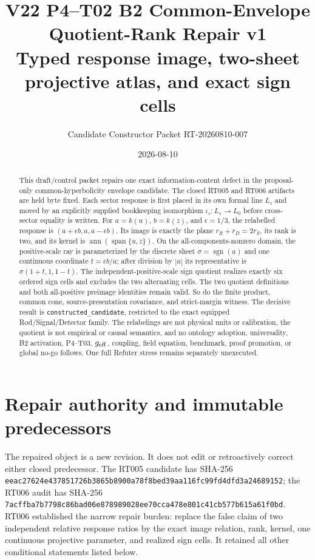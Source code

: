 \documentclass[11pt]{article}
\title{V22 P4--T02 B2 Common-Envelope Quotient-Rank Repair v1\\
\large Typed response image, two-sheet projective atlas, and exact sign cells}
\author{Candidate Constructor Packet RT-20260810-007}
\date{2026-08-10}
\newcommand{\ann}{\operatorname{ann}}
\newcommand{\sgn}{\operatorname{sgn}}
\begin{document}
\sloppy
\maketitle

\begin{abstract}
This draft/control packet repairs one exact information-content defect in the
proposal-only common-hyperbolicity envelope candidate.  The closed RT005 and
RT006 artifacts are held byte fixed.  Each sector response is first placed in
its own formal line $L_s$ and moved by an explicitly supplied bookkeeping
isomorphism $\iota_s:L_s\to L_0$ before cross-sector equality is written.
For $a=k(u)$, $b=k(z)$, and $\epsilon=1/3$, the relabelled response is
$(a+\epsilon b,a,a-\epsilon b)$.  Its image is exactly the plane
$r_R+r_D=2r_S$, its rank is two, and its kernel is
$\ann(\operatorname{span}\{u,z\})$.  On the all-components-nonzero domain,
the positive-scale ray is parameterized by the discrete sheet
$\sigma=\sgn(a)$ and one continuous coordinate
$t=\epsilon b/a$; after division by $|a|$ its representative is
$\sigma(1+t,1,1-t)$.  The independent-positive-scale sign quotient realizes
exactly six ordered sign cells and excludes the two alternating cells.
The two quotient definitions and both all-positive preimage identities remain
valid.  So do the finite product, common cone, source-presentation covariance,
and strict-margin witness.  The decisive result is
\texttt{constructed\_candidate}, restricted to the exact equipped
Rod/Signal/Detector family.  The relabelings are not physical units or
calibration, the quotient is not empirical or causal semantics, and no
ontology adoption, universality, B2 activation, P4--T03, $g_{\rm eff}$,
coupling, field equation, benchmark, proof promotion, or global no-go follows.
One full Refuter stress remains separately unexecuted.
\end{abstract}

\section{Repair authority and immutable predecessors}

The repaired object is a new revision.  It does not edit or retroactively
correct either closed predecessor.  The RT005 candidate has SHA-256
\texttt{eeac27624e437851726b3865b8900a78f8bed39aa116fc99fd4dfd3a24689152};
the RT006 audit has SHA-256
\texttt{7acffba7b7798c86bad06e878989028ee70cca478e801c41cb577b615a61f0bd}.
RT006 established the narrow repair burden: replace the false claim of two
independent relative response ratios by the exact image relation, rank, kernel,
one continuous projective parameter, and realized sign cells.  It retained all
other conditional statements listed below.
\end{document}
